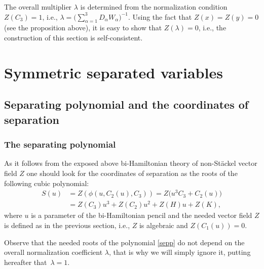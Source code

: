 \documentclass[10pt,a4paper]{amsart}
\def\a{\alpha}
\def\l{\lambda}
\numberwithin{equation}{section}
\begin{document}
\begin{Remark}
The overall multiplier $\l$ is determined from the normalization condition $Z(C_3)=1$, i.e., $\l=\bigl(\sum_{\a=1}^3 D_{\a} W_{\a})^{-1}$. Using the fact that $Z(x)=Z(y)=0$ (see the proposition above), it is easy to show that $Z(\l)=0$, i.e., the construction of this section is self-consistent.
\end{Remark}
\section{Symmetric separated variables}\label{sec5}
\subsection{Separating polynomial and the coordinates of separation}
\subsubsection{The separating polynomial}
As it follows from the exposed above bi-Hamiltonian theory of non-St\"ackel vector field $Z$ one should look for the coordinates of separation as the roots of the following cubic polynomial:
\begin{align}
S(u)&= Z(\phi(u,C_2(u),C_3))= Z\big(u^3 C_3+C_2(u)\big)\nonumber\\
&= Z(C_3) u^3+ Z(C_2) u^2+ Z(H) u +Z(K),\label{sepp}
\end{align}
where $u$ is a parameter of the bi-Hamiltonian pencil and the needed vector field $Z$ is defined as in the previous section, i.e., $Z$ is algebraic and $Z(C_1(u))=0$.


\begin{Remark}
 Observe that the needed roots of the polynomial \eqref{sepp} do not depend on the overall normalization coefficient $\l$, that is why we will simply ignore it, putting hereafter that~${\l=1}$.
 \end{Remark}
\end{document}
